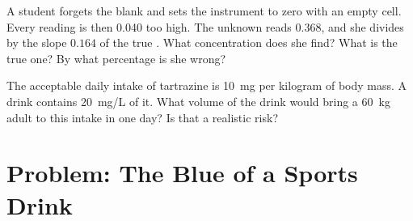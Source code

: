 \begin{exercise}[$\star\star\star$]\label{exo:g11:absorbance:14}
A student forgets the blank and sets the instrument to zero with an empty
cell. Every reading is then \num{0.040} too high. The unknown reads
$0.368$, and she divides by the slope $0.164$ of the true . What concentration does she find? What is the true one? By what
percentage is she wrong?
\end{exercise}

\begin{exercise}[$\star\star\star$]\label{exo:g11:absorbance:15}
The acceptable daily intake of tartrazine is \qty{10}{mg} per kilogram
of body mass. A drink contains \qty{20}{mg/L} of it. What volume of the
drink would bring a \qty{60}{kg} adult to this intake in one day? Is
that a realistic risk?
\end{exercise}

\section{Problem: The Blue of a Sports Drink}


